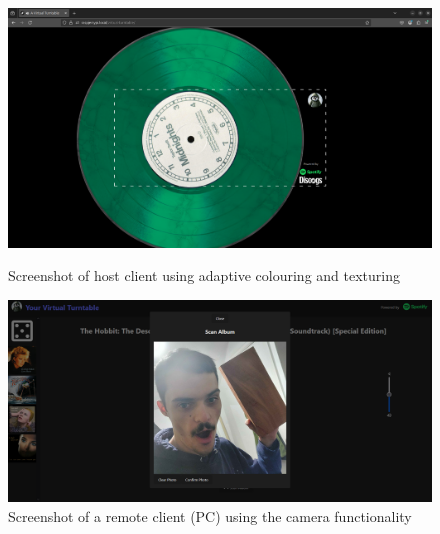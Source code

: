 \begin{uomappendix}
            \begin{figure}[H]
                \centering
                \begin{minipage}[b]{0.45\textwidth}
                    \centering
                    \includegraphics[width=\textwidth]{images/screenshots/HOST_Green.png}
                    \caption{Screenshot of host client using adaptive colouring and texturing}
                    \label{fig:hostGreen}
                \end{minipage}
                \hfill
                \begin{minipage}[b]{0.45\textwidth}
                    \centering
                    \includegraphics[width=\textwidth]{images/screenshots/LAPTOP_Cam.png}
                    \caption{Screenshot of a remote client (PC) using the camera functionality}
                    \label{fig:laptopCam}
                \end{minipage}
            \end{figure}
                

\end{uomappendix}
